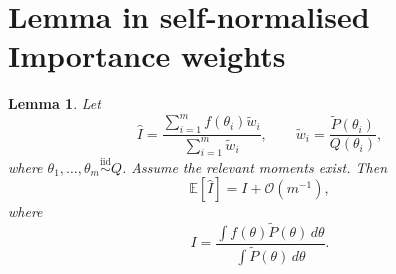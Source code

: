 \documentclass[11pt, titlepage]{article} %
\numberwithin{equation}{section}
\newtheorem{lemma}{Lemma}
\theoremstyle{definition}
\numberwithin{assumption}{section}
\begin{document}
\section{Lemma in self-normalised Importance weights}
\begin{lemma}
Let
\begin{equation*}
    \hat I
    =
    \frac{\sum_{i=1}^m f(\theta_i)\tilde w_i}{\sum_{i=1}^m \tilde w_i},
    \qquad
    \tilde w_i=\frac{\tilde P(\theta_i)}{Q(\theta_i)},
\end{equation*}
where $\theta_1,\dots,\theta_m \overset{\mathrm{iid}}{\sim} Q$. Assume the relevant moments exist. Then
\begin{equation*}
    \mathbb{E}[\hat I]=I+\mathcal{O}(m^{-1}),
\end{equation*}
where
\begin{equation*}
    I=\frac{\int f(\theta)\tilde P(\theta)\,d\theta}{\int \tilde P(\theta)\,d\theta}.
\end{equation*}
\end{lemma}
\end{document}
